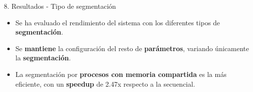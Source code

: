\documentclass[spanish]{beamer}
\begin{document}
\begin{frame}{8. Resultados - Tipo de segmentación}
    \begin{itemize}
        \item Se ha evaluado el rendimiento del sistema con los diferentes tipos de \textbf{segmentación}.
        \item Se \textbf{mantiene} la configuración del resto de \textbf{parámetros}, variando únicamente la \textbf{segmentación}.
        \item La segmentación por \textbf{procesos con memoria compartida} es la más eficiente, con un \textbf{speedup} de 2.47x respecto a la secuencial.
    \end{itemize}

    \vspace{0.5cm}
    \begin{table}[H]
        \centering
\end{table}
\end{frame}
\end{document}
